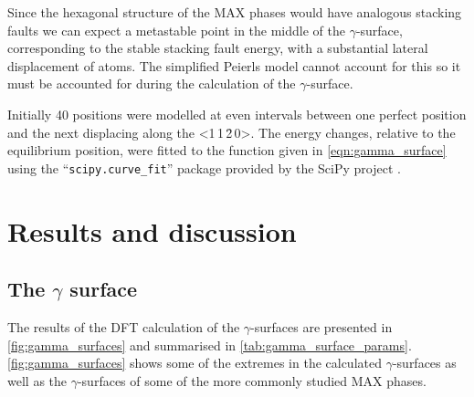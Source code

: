 Since the hexagonal structure of the MAX phases would have analogous stacking faults we can expect a metastable point in the middle of the $\gamma$-surface, corresponding to the stable stacking fault energy, with a substantial lateral displacement of atoms. The simplified Peierls model cannot account for this so it must be accounted for during the calculation of the $\gamma$-surface.

Initially 40 positions were modelled at even intervals between one perfect position and the next displacing along the <1\,1\,\={2}\,0>. The energy changes, relative to the equilibrium position, were fitted to the function given in \autoref{eqn:gamma_surface} using the ``\texttt{scipy.curve\_fit}'' package provided by the SciPy project \cite{SciPy2001}.





\section{Results and discussion}

\subsection{The \texorpdfstring{$\gamma$}{gamma} surface}
The results of the DFT calculation of the $\gamma$-surfaces are presented in \autoref{fig:gamma_surfaces} and summarised in \autoref{tab:gamma_surface_params}. \autoref{fig:gamma_surfaces} shows some of the extremes in the calculated $\gamma$-surfaces as well as the $\gamma$-surfaces of some of the more commonly studied MAX phases. 


